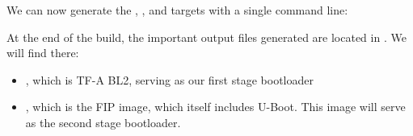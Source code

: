 We can now generate the , , and  targets
with a single command line:

At the end of the build, the important output files generated are
located in . We will find there:

\begin{itemize}

\item {}, which is TF-A BL2, serving as
  our first stage bootloader

\item {}, which is the FIP image, which itself includes
  U-Boot. This image will serve as the second stage bootloader.

\end{itemize}

